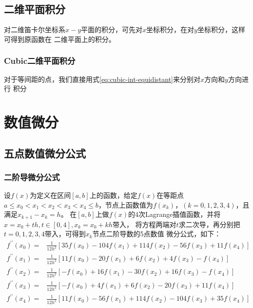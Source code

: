 \section{二维平面积分}
对二维笛卡尔坐标系$x-y$平面的积分，可先对$x$坐标积分，在对$y$坐标积分，这样可得到原函数在
二维平面上的积分。
\subsection{Cubic二维平面积分}
对于等间距的点，我们直接用式\eqref{eq:cubic-int-equidistant}来分别对$x$方向和$y$方向进行
积分







\chapter{数值微分}
\section{五点数值微分公式}
\subsection{二阶导微分公式}
设$f(x)$为定义在区间$[a,b]$上的函数，给定$f(x)$在等距点$a \leqslant x_0 < x_1 < x_2 < x_3
< x_4 \leqslant b$，节点上函数值为$f(x_k)$，$(k=0, 1, 2, 3, 4)$，且满足$x_{k+1}-x_k=h$。
在$[a,b]$上做$f(x)$的4次Lagrange插值函数，并将$x=x_0+th, t \in [0, 4], x_k = x_0+kh$带入，
将方程两端对$t$求二次导，再分别把$t=0, 1, 2, 3, 4$带入，可得到$x_k$节点二阶导数的5点数值
微分公式，如下：
\begin{equation}
	\begin{aligned}
		f^{\prime\prime}(x_0) =& \frac{1}{12h^2}[35f(x_0) - 104f(x_1) + 114f(x_2) - 56f(x_3) + 11f(x_4)] \\
		f^{\prime\prime}(x_1) =& \frac{1}{12h^2}[11f(x_0) -  20f(x_1) +   6f(x_2) +  4f(x_3) -   f(x_4)] \\
		f^{\prime\prime}(x_2) =& \frac{1}{12h^2}[ -f(x_0) +  16f(x_1) -  30f(x_2) + 16f(x_3) -   f(x_4)] \\
		f^{\prime\prime}(x_3) =& \frac{1}{12h^2}[ -f(x_0) +   4f(x_1) +   6f(x_2) - 20f(x_3) + 11f(x_4)] \\
		f^{\prime\prime}(x_4) =& \frac{1}{12h^2}[11f(x_0) -  56f(x_1) + 114f(x_2) -104f(x_3) + 35f(x_4)]
	\end{aligned}
\end{equation} 





